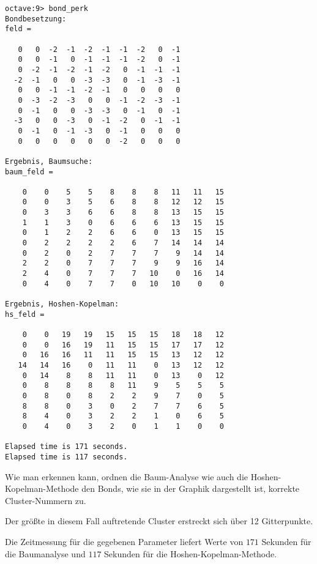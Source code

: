 \begin{lstlisting}[caption=Ausgabe von \lref{bond_perk},label=lst:output]
octave:9> bond_perk
Bondbesetzung:
feld =

   0   0  -2  -1  -2  -1  -1  -2   0  -1
   0   0  -1   0  -1  -1  -1  -2   0  -1
   0  -2  -1  -2  -1  -2   0  -1  -1  -1
  -2  -1   0   0  -3  -3   0  -1  -3  -1
   0   0  -1  -1  -2  -1   0   0   0   0
   0  -3  -2  -3   0   0  -1  -2  -3  -1
   0  -1   0   0  -3  -3   0  -1   0  -1
  -3   0   0  -3   0  -1  -2   0  -1  -1
   0  -1   0  -1  -3   0  -1   0   0   0
   0   0   0   0   0   0  -2   0   0   0

Ergebnis, Baumsuche:
baum_feld =

    0    0    5    5    8    8    8   11   11   15
    0    0    3    5    6    8    8   12   12   15
    0    3    3    6    6    8    8   13   15   15
    1    1    3    0    6    6    6   13   15   15
    0    1    2    2    6    6    0   13   15   15
    0    2    2    2    2    6    7   14   14   14
    0    2    0    2    7    7    7    9   14   14
    2    2    0    7    7    7    9    9   16   14
    2    4    0    7    7    7   10    0   16   14
    0    4    0    7    7    0   10   10    0    0

Ergebnis, Hoshen-Kopelman:
hs_feld =

    0    0   19   19   15   15   15   18   18   12
    0    0   16   19   11   15   15   17   17   12
    0   16   16   11   11   15   15   13   12   12
   14   14   16    0   11   11    0   13   12   12
    0   14    8    8   11   11    0   13    0   12
    0    8    8    8    8   11    9    5    5    5
    0    8    0    8    2    2    9    7    0    5
    8    8    0    3    0    2    7    7    6    5
    8    4    0    3    2    2    1    0    6    5
    0    4    0    3    2    0    1    1    0    0

Elapsed time is 171 seconds.
Elapsed time is 117 seconds.
\end{lstlisting}

Wie man erkennen kann, ordnen die Baum-Analyse wie auch die Hoshen-Kopelman-Methode den Bonds, wie sie in der Graphik dargestellt
ist, korrekte Cluster-Nummern zu.

Der größte in diesem Fall auftretende Cluster erstreckt sich über 12 Gitterpunkte.

Die Zeitmessung für die gegebenen Parameter liefert Werte von $171$ Sekunden für die
Baumanalyse und $117$ Sekunden für die Hoshen-Kopelman-Methode.